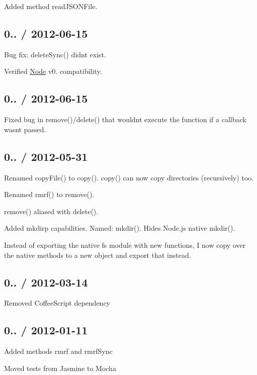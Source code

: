 \begin{DoxyItemize}
\item Added method {\ttfamily read\+J\+S\+O\+N\+File}.
\end{DoxyItemize}

\subsection*{0.. / 2012-\/06-\/15 }


\begin{DoxyItemize}
\item Bug fix\+: {\ttfamily delete\+Sync()} didn\textquotesingle{}t exist.
\item Verified \mbox{\hyperlink{classNode}{Node}} v0. compatibility.
\end{DoxyItemize}

\subsection*{0.. / 2012-\/06-\/15 }


\begin{DoxyItemize}
\item Fixed bug in {\ttfamily remove()}/{\ttfamily delete()} that wouldn\textquotesingle{}t execute the function if a callback wasn\textquotesingle{}t passed.
\end{DoxyItemize}

\subsection*{0.. / 2012-\/05-\/31 }


\begin{DoxyItemize}
\item Renamed {\ttfamily copy\+File()} to {\ttfamily copy()}. {\ttfamily copy()} can now copy directories (recursively) too.
\item Renamed {\ttfamily rmrf()} to {\ttfamily remove()}.
\item {\ttfamily remove()} aliased with {\ttfamily delete()}.
\item Added {\ttfamily mkdirp} capabilities. Named\+: {\ttfamily mkdir()}. Hides Node.\+js native {\ttfamily mkdir()}.
\item Instead of exporting the native {\ttfamily fs} module with new functions, I now copy over the native methods to a new object and export that instead.
\end{DoxyItemize}

\subsection*{0.. / 2012-\/03-\/14 }


\begin{DoxyItemize}
\item Removed Coffee\+Script dependency
\end{DoxyItemize}

\subsection*{0.. / 2012-\/01-\/11 }


\begin{DoxyItemize}
\item Added methods rmrf and rmrf\+Sync
\item Moved tests from Jasmine to Mocha 
\end{DoxyItemize}